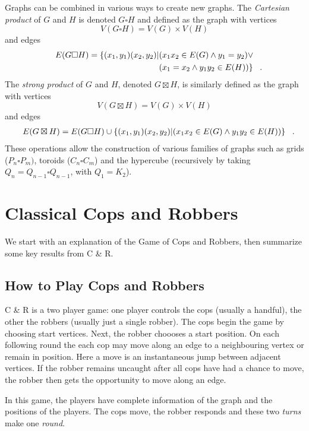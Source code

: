 Graphs can be combined in various ways to create new graphs.
The \textit{Cartesian product} of $G$ and $H$ is denoted $G \square H$ and defined as the graph with vertices
\[ V(G \square H) = V(G) \times V(H) \]
and edges
\begin{align*}
  E(G \square H) = \{ (x_1,y_1)(x_2,y_2) | &(x_1x_2 \in E(G) \land y_1 = y_2) \lor \\
  & (x_1 = x_2 \land y_1y_2 \in E(H)) \} \mperiod
\end{align*}
The \textit{strong product} of $G$ and $H$, denoted $G \boxtimes H$, is similarly defined as the graph with vertices
\[ V(G \boxtimes H) = V(G) \times V(H) \]
and edges
\begin{align*}
  E(G \boxtimes H) = E(G \square H) \cup \{ (x_1,y_1)(x_2,y_2) | (x_1x_2 \in E(G) \land y_1y_2 \in E(H)) \} \mperiod
\end{align*}
These operations allow the construction of various families of graphs such as grids ($P_n \square P_m)$, toroids ($C_n \square C_m$) and the hypercube (recursively by taking $Q_n = Q_{n - 1} \square Q_{n - 1}$, with $Q_1 = K_2$).

\section{Classical Cops and Robbers}

We start with an explanation of the Game of Cops and Robbers, then summarize some key results from C \& R.

\subsection{How to Play Cops and Robbers}

C \& R is a two player game: one player controls the cops (usually a handful), the other the robbers (usually just a single robber).
The cops begin the game by choosing start vertices. Next, the robber choooses a start position.
On each following round the each cop may move along an edge to a neighbouring vertex
or remain in position.
Here a move is an instantaneous jump between adjacent vertices.
If the robber remains uncaught after all cops have had a chance to move, the
robber then gets the opportunity to move along an edge.

In this game, the players have complete information of the graph and the positions of the players.
The cops move, the robber responds and these two \textit{turns} make one \textit{round}.

